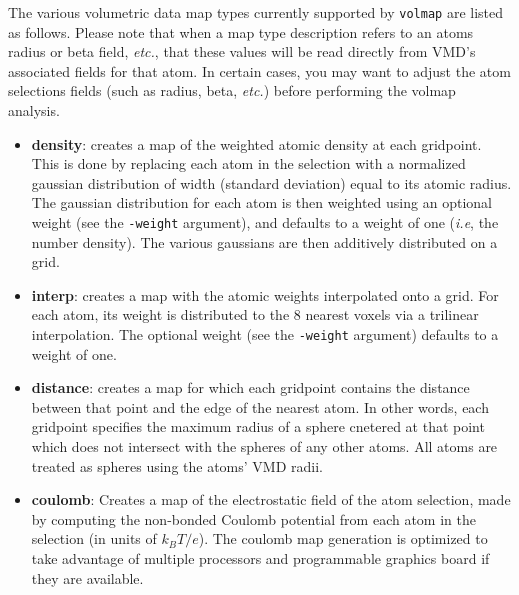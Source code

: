 The various volumetric data map types currently supported by {\tt volmap} are
listed as follows. Please note that when a map type description refers to an atoms radius
or beta field, \emph{etc.}, that these values will be read directly from VMD's
associated fields for that atom. In certain cases, you may want to adjust the
atom selections fields (such as radius, beta, \emph{etc.}) before performing the
volmap analysis.
\begin{itemize} 

  \item {\bf density}: creates a map of the weighted atomic density at each
  gridpoint. This is done by replacing each atom in the selection with a
  normalized gaussian distribution of width (standard deviation) equal to its
  atomic radius. The gaussian distribution for each atom is then weighted using
  an optional weight (see the {\tt -weight} argument), and defaults to a weight
  of one (\emph{i.e}, the number density). The various gaussians are then
  additively distributed on a grid. 

  \item {\bf interp}: creates a map with the atomic weights interpolated
  onto a grid. For each atom, its weight is distributed to the 8 nearest 
  voxels via a trilinear interpolation. The optional weight (see the
  {\tt -weight} argument) defaults to a weight of one.

  \item {\bf distance}: creates a map for which each gridpoint contains the
  distance between that point and the edge of the nearest atom. In other words,
  each gridpoint specifies the maximum radius of a sphere cnetered at that point
  which does not intersect with the spheres of any other atoms. All atoms are
  treated as spheres using the atoms' VMD radii.

  
  \item {\bf coulomb}: Creates a map of the electrostatic field of the atom
  selection, made by computing the non-bonded Coulomb potential from each atom
  in the selection (in units of $k_BT/e$). The coulomb map generation is
  optimized to take advantage of multiple processors and programmable graphics
  board if they are available.

  
  

\end{itemize}
